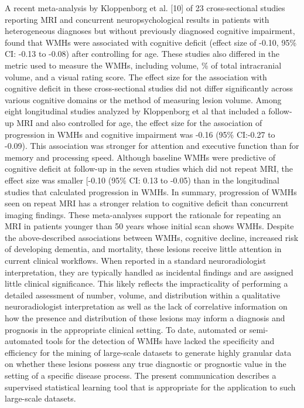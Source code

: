 \documentclass[11pt,]{article}
\begin{document}
A recent meta-analysis by Kloppenborg et al. {[}10{]} of 23
cross-sectional studies reporting MRI and concurrent neuropsychological
results in patients with heterogeneous diagnoses but without previously
diagnosed cognitive impairment, found that WMHs were associated with
cognitive deficit (effect size of -0.10, 95\% CI: -0.13 to -0.08) after
controlling for age. These studies also differed in the metric used to
measure the WMHs, including volume, \% of total intracranial volume, and
a visual rating score. The effect size for the association with
cognitive deficit in these cross-sectional studies did not differ
significantly across various cognitive domains or the method of
measuring lesion volume. Among eight longitudinal studies analyzed by
Kloppenborg et al that included a follow-up MRI and also controlled for
age, the effect size for the association of progression in WMHs and
cognitive impairment was -0.16 (95\% CI:-0.27 to -0.09). This
association was stronger for attention and executive function than for
memory and processing speed. Although baseline WMHs were predictive of
cognitive deficit at follow-up in the seven studies which did not repeat
MRI, the effect size was smaller {[}-0.10 (95\% CI: 0.13 to -0.05) than
in the longitudinal studies that calculated progression in WMHs. In
summary, progression of WMHs seen on repeat MRI has a stronger relation
to cognitive deficit than concurrent imaging findings. These
meta-analyses support the rationale for repeating an MRI in patients
younger than 50 years whose initial scan shows WMHs. Despite the
above-described associations between WMHs, cognitive decline, increased
risk of developing dementia, and mortality, these lesions receive little
attention in current clinical workflows. When reported in a standard
neuroradiologist interpretation, they are typically handled as
incidental findings and are assigned little clinical significance. This
likely reflects the impracticality of performing a detailed assessment
of number, volume, and distribution within a qualitative
neuroradiologist interpretation as well as the lack of correlative
information on how the presence and distribution of these lesions may
inform a diagnosis and prognosis in the appropriate clinical setting. To
date, automated or semi-automated tools for the detection of WMHs have
lacked the specificity and efficiency for the mining of large-scale
datasets to generate highly granular data on whether these lesions
possess any true diagnostic or prognostic value in the setting of a
specific disease process. The present communication describes a
supervised statistical learning tool that is appropriate for the
application to such large-scale datasets.
\end{document}

